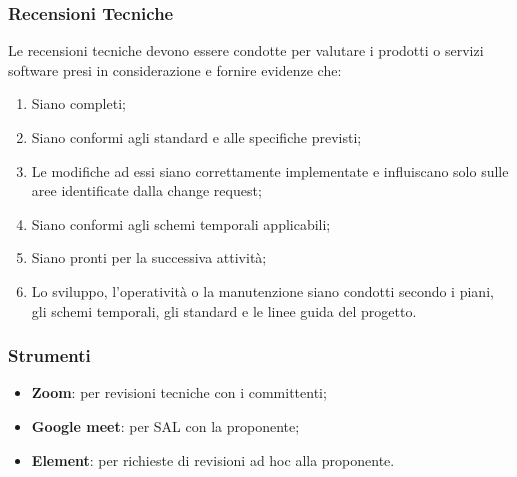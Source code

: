 \subsubsection{Recensioni Tecniche}
Le recensioni tecniche devono essere condotte per valutare i prodotti o servizi software presi in considerazione e fornire evidenze che:
\begin{enumerate}
    \item Siano completi;
    \item Siano conformi agli standard e alle specifiche previsti;
    \item Le modifiche ad essi siano correttamente implementate e influiscano solo sulle aree identificate dalla change request;
    \item Siano conformi agli schemi temporali applicabili;
    \item Siano pronti per la successiva attività;
    \item Lo sviluppo, l'operatività o la manutenzione siano condotti secondo i piani, gli schemi temporali, gli standard e le linee guida del progetto.
\end{enumerate}


\subsubsection{Strumenti}
\begin{itemize}
    \item \textbf{Zoom}: per revisioni tecniche con i committenti;
    \item \textbf{Google meet}: per SAL con la proponente; 
    \item \textbf{Element}: per richieste di revisioni ad hoc alla proponente.
\end{itemize}